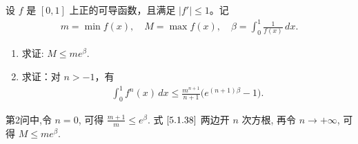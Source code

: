 \documentclass[../../main.tex]{subfiles}
\begin{document}
\begin{example}
设 \( f \) 是 \([0,1]\) 上正的可导函数，且满足 \(|f'| \leq 1\)。记  
\begin{align}
m = \min f(x), \quad M = \max f(x), \quad \beta = \int_{0}^{1} \frac{1}{f(x)} \, dx. \label{5.1.37}
\end{align}
\begin{enumerate}
\item 求证: \( M \leq m e^{\beta} \).

\item 求证：对 \( n > -1 \)，有  
\begin{align}
\int_{0}^{1} f^n(x) \, dx \leq \frac{m^{n + 1}}{n + 1} \big( e^{(n + 1)\beta} - 1 \big). \label{5.1.38}
\end{align}  
\end{enumerate}  
\end{example}
\begin{remark}
第2问中,令 \( n = 0 \), 可得 \( \frac{m + 1}{m} \leq e^{\beta} \). 式 \(\eqref{5.1.38}\) 两边开 \( n \) 次方根, 再令 \( n \to +\infty \), 可得 \( M \leq m e^{\beta} \).
\end{remark}
\end{document}
